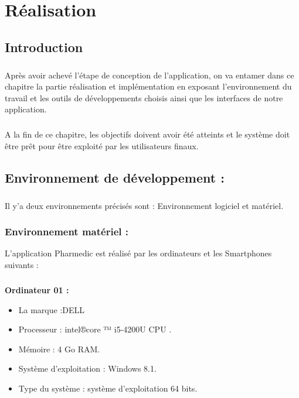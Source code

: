 \documentclass[12pt, openany]{report}
\begin{document}
\chapter{Réalisation}
\newpage
\section{Introduction}
\large
\paragraph{} Après avoir achevé l’étape de conception de l’application, on va entamer dans ce chapitre la partie réalisation et implémentation en exposant l’environnement du travail et les outils de développements choisis ainsi que les interfaces de notre application.
\paragraph{} A la fin de ce chapitre,  les objectifs doivent avoir été atteints et le système doit être prêt pour être exploité par les utilisateurs finaux.
\section{Environnement de développement :}
\paragraph{}Il y'a deux environnements précisés sont : Environnement logiciel et matériel.
\subsection{Environnement matériel : }
L’application Pharmedic  est réalisé par les ordinateurs et les Smartphones suivants :
\paragraph{}\textbf{Ordinateur 01 :}\\[0.4cm]
	\begin{itemize}\renewcommand {\labelitemi }{$\bullet $}
		\item La marque :DELL
		\item Processeur : intel®core ™ i5-4200U CPU .
		\item Mémoire : 4 Go RAM. 
		\item Système d’exploitation : Windows 8.1. 
		\item Type du système : système d’exploitation 64 bits.
	\end{itemize}
\end{document}
